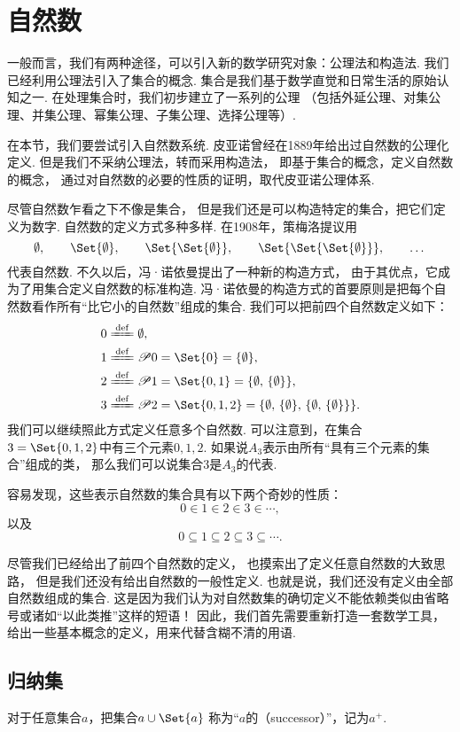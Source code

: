 \section{自然数}
一般而言，我们有两种途径，可以引入新的数学研究对象：公理法和构造法.
我们已经利用公理法引入了集合的概念.
集合是我们基于数学直觉和日常生活的原始认知之一.
在处理集合时，我们初步建立了一系列的公理%
（包括外延公理、对集公理、并集公理、幂集公理、子集公理、选择公理等）.

在本节，我们要尝试引入自然数系统.
皮亚诺曾经在1889年给出过自然数的公理化定义.
但是我们不采纳公理法，转而采用构造法，
即基于集合的概念，定义自然数的概念，
通过对自然数的必要的性质的证明，取代皮亚诺公理体系.

尽管自然数乍看之下不像是集合，
但是我们还是可以构造特定的集合，把它们定义为数字.
自然数的定义方式多种多样.
在1908年，策梅洛提议用\[
	\emptyset, \qquad
	\Set{\emptyset}, \qquad
	\Set{\Set{\emptyset}}, \qquad
	\Set{\Set{\Set{\emptyset}}}, \qquad
	\dotsc
\]代表自然数.
不久以后，冯·诺依曼提出了一种新的构造方式，
由于其优点，它成为了用集合定义自然数的标准构造.
冯·诺依曼的构造方式的首要原则是把每个自然数看作所有“比它小的自然数”组成的集合.
我们可以把前四个自然数定义如下：\begin{align*}
	&0 \defeq \emptyset, \\
	&1 \defeq \Powerset0 = \Set{0} = \NaturalSet{1}, \\
	&2 \defeq \Powerset1 = \Set{0,1} = \NaturalSet{2}, \\
	&3 \defeq \Powerset2 = \Set{0,1,2} = \NaturalSet{3}.
\end{align*}
我们可以继续照此方式定义任意多个自然数.
可以注意到，在集合\(3=\Set{0,1,2}\)中有三个元素\(0,1,2\).
如果说\(A_3\)表示由所有“具有三个元素的集合”组成的类，
那么我们可以说集合\(3\)是\(A_3\)的代表.

容易发现，这些表示自然数的集合具有以下两个奇妙的性质：\[
	0 \in 1 \in 2 \in 3 \in \dotsb,
\]
以及\[
	0 \subseteq 1 \subseteq 2 \subseteq 3 \subseteq \dotsb.
\]

尽管我们已经给出了前四个自然数的定义，
也摸索出了定义任意自然数的大致思路，
但是我们还没有给出自然数的一般性定义.
也就是说，我们还没有定义由全部自然数组成的集合.
这是因为我们认为对自然数集的确切定义不能依赖类似由省略号或诸如“以此类推”这样的短语！
因此，我们首先需要重新打造一套数学工具，给出一些基本概念的定义，用来代替含糊不清的用语.

\subsection{归纳集}
\begin{definition}[后继]\label{definition:集合论.后继的定义}
对于任意集合\(a\)，把集合\(a \cup \Set{a}\)%
称为“\(a\)的（successor）”，记为\(a^+\).
\end{definition}

